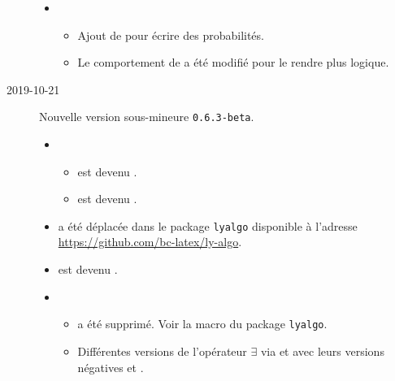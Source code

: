 \documentclass[12pt,a4paper]{article}
\begin{document}
\begin{description}
\begin{itemize}[itemsep=.5em]
    
    
    
        \item {}
        \begin{itemize}[itemsep=.5em]
            \item Ajout de  pour écrire des probabilités.
    
    		\item Le comportement de  a été modifié pour le rendre plus logique.
        \end{itemize}
    \end{itemize}


    \medskip
    \item[2019-10-21] Nouvelle version sous-mineure \verb+0.6.3-beta+.
    
    \begin{itemize}[itemsep=.5em]
        \item {}
        \begin{itemize}[itemsep=.5em]
            \item {} est devenu .
    
            \item {} est devenu .
        \end{itemize}
    
    
    
    
        \item {}
               a été déplacée dans le package \verb+lyalgo+ disponible à l'adresse \url{https://github.com/bc-latex/ly-algo}.
    
    
    
    
        \item {}
               est devenu .
    
    
    
    
        \item {}
        \begin{itemize}[itemsep=.5em]
            \item {} a été supprimé. Voir la macro  du package \verb+lyalgo+.
    
            \item Différentes versions de l'opérateur $\exists$ via  et  avec leurs versions négatives  et .
    

\end{itemize}
\end{itemize}
\end{description}
\end{document}
